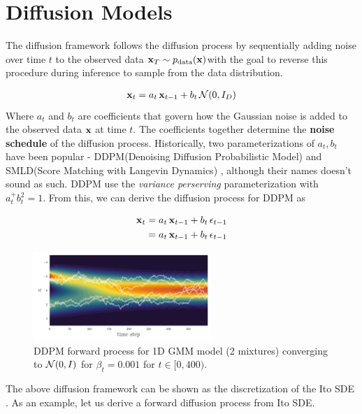 \documentclass[a4paper, 11pt]{article}
\begin{document}
\section{Diffusion Models}

The diffusion framework follows the diffusion process by sequentially adding noise over time $t$ to the observed data $\mbox{$\mbox{$\mathbf{x}$}$}_T \sim p_{\text{data}}(\mbox{$\mbox{$\mathbf{x}$}$})$with the goal to reverse this procedure during inference to sample from the data distribution.

\begin{align}
    \mbox{$\mbox{$\mathbf{x}$}$}_t &= a_t \, \mbox{$\mbox{$\mathbf{x}$}$}_{t-1} + b_t \, \mbox{$\cal N$}(0, I_D) \\
\end{align}
Where $a_t$ and $b_t$ are coefficients that govern how the Gaussian noise is added to the observed data $\mbox{$\mbox{$\mathbf{x}$}$}$ at time $t$. The coefficients together determine the \textbf{noise schedule} of the diffusion process. Historically, two parameterizations of $a_t, b_t$ have been popular - DDPM(Denoising Diffusion  Probabilistic Model)\citep{ho2020denoising} and SMLD(Score Matching with Langevin Dynamics) \citep{song2019generative}, although their names doesn't sound as such. DDPM use the \emph{variance perserving} parameterization with $a_t^ + b_t^2 = 1$. From this, we can derive the diffusion process for DDPM as

\begin{align}
    \mbox{$\mbox{$\mathbf{x}$}$}_t &= a_t \, \mbox{$\mbox{$\mathbf{x}$}$}_{t-1} + b_t \, \epsilon_{t-1} \\
    &= a_t \, \mbox{$\mbox{$\mathbf{x}$}$}_{t-1} + b_t \, \epsilon_{t-1} \\
\end{align}

\begin{figure}[ht]
    \centering
    \includegraphics[width=0.6\textwidth]{figs/gmm_ddpm.pdf}
    \caption{DDPM forward process for 1D GMM model (2 mixtures) converging to $\mbox{$\cal N$}(0, I)$ for $\beta_t = 0.001$ for $t \in [0, 400)$.}
    \label{fig:class_guidance}
\end{figure}

The above diffusion framework can be shown as the discretization of the Ito SDE \citep{song2020score}. As an example, let us derive a forward diffusion process from Ito SDE.
\end{document}

